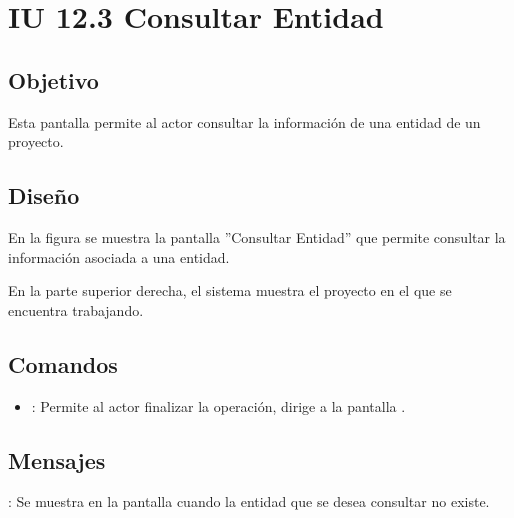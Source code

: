 \section{IU 12.3 Consultar Entidad}

\subsection{Objetivo}
	Esta pantalla permite al actor consultar la información de una entidad de un proyecto.
\subsection{Diseño}
	En la figura  se muestra la pantalla ''Consultar Entidad'' que permite consultar la información asociada  a una entidad.
	
	En la parte superior derecha, el sistema muestra el proyecto en el que se encuentra trabajando.

\subsection{Comandos}
\begin{itemize}
	\item {}: Permite al actor finalizar la operación, dirige a la pantalla .
\end{itemize}

\subsection{Mensajes}

\begin{Citemize}
	\item {}: Se muestra en la pantalla  cuando la entidad que se desea consultar no existe.
\end{Citemize}
